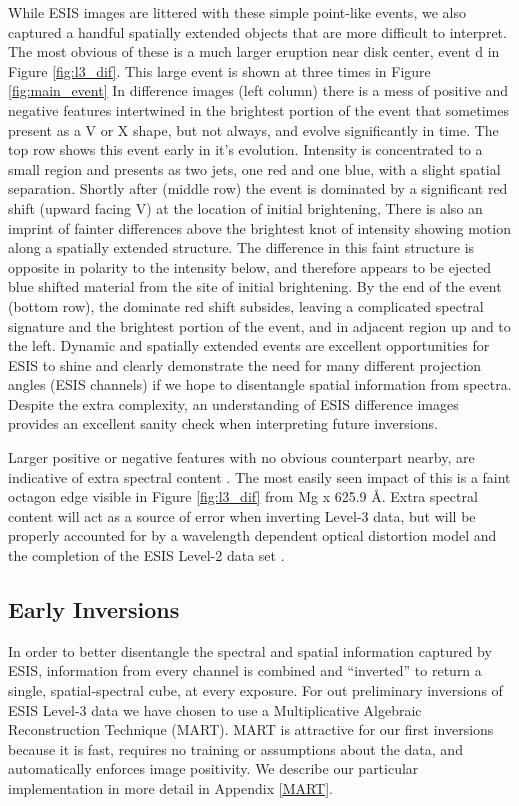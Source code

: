     	While ESIS images are littered with these simple point-like events, we also captured a handful spatially extended objects that are more difficult to interpret.
    	The most obvious of these is a much larger eruption near disk center, event d in Figure \ref{fig:l3_dif}.
    	This large event is shown at three times in Figure \ref{fig:main_event}
    	In difference images (left column) there is a mess of positive and negative features intertwined in the brightest portion of the event that sometimes present as a V or X shape, but not always, and evolve significantly in time.
    	The top row shows this event early in it's evolution. 
    	Intensity is concentrated to a small region and presents as two jets, one red and one blue, with a slight spatial separation.
    	Shortly after (middle row) the event is dominated by a significant red shift (upward facing V) at the location of initial brightening, 
    	There is also an imprint of fainter differences above the brightest knot of intensity showing motion along a spatially extended structure.
    	The difference in this faint structure is opposite in polarity to the intensity below, and therefore appears to be ejected blue shifted material from the site of initial brightening.
    	By the end of the event (bottom row), the dominate red shift subsides, leaving a complicated spectral signature and the brightest portion of the event, and in adjacent region up and to the left.  
    	Dynamic and spatially extended events are excellent opportunities for ESIS to shine and clearly demonstrate the need for many different projection angles (ESIS channels) if we hope to disentangle spatial information from spectra.
    	Despite the extra complexity, an understanding of ESIS difference images provides an excellent sanity check when interpreting future inversions.
    	
    
    	Larger positive or negative features with no obvious counterpart nearby, are indicative of extra spectral content \citep{RustPhD,Parker2021}.
    	The most easily seen impact of this is a faint octagon edge visible in Figure \ref{fig:l3_dif} from Mg {\sc x} 625.9 \AA.
    	Extra spectral content will act as a source of error when inverting Level-3 data, but will be properly accounted for by a wavelength dependent optical distortion model and the completion of the ESIS Level-2 data set \citep{Smart2022}. 	 
    
    
    \subsection{Early Inversions}
    	In order to better disentangle the spectral and spatial information captured by ESIS, information from every channel is combined and ``inverted'' to return a single, spatial-spectral cube, at every exposure.
    	For out preliminary inversions of ESIS Level-3 data we have chosen to use a Multiplicative Algebraic Reconstruction Technique (MART).
    	MART is attractive for our first inversions because it is fast, requires no training or assumptions about the data, and automatically enforces image  positivity.
    	We describe our particular implementation in more detail in Appendix \ref{MART}.
    	
